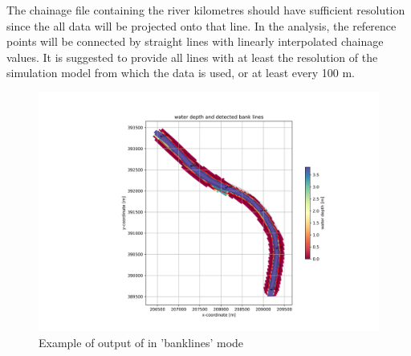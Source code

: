 \Note The chainage file containing the river kilometres should have sufficient resolution since the all data will be projected onto that line.
In the analysis, the reference points will be connected by straight lines with linearly interpolated chainage values.
It is suggested to provide all lines with at least the resolution of the simulation model from which the data is used, or at least every 100 m.

\begin{figure}
\includegraphics[width=\textwidth]{figures/1_banklinedetection.png}
\caption{Example of output of \dfastbe in 'banklines' mode}
\label{Fig2.2}
\end{figure}

